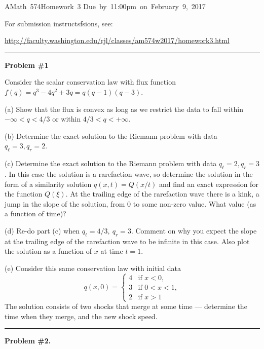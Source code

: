 \documentclass[11pt]{article}
\begin{document}
\hfill\vbox{\hbox{AMath 574}\hbox{Homework 3}
\hbox{Due by 11:00pm on February 9, 2017}}

For submission instructsfsions, see:

\url{http://faculty.washington.edu/rjl/classes/am574w2017/homework3.html}




\vskip 1cm
\hrule
{\bf Problem \#1}

Consider the scalar conservation law with flux function $f(q) = q^3 - 4q^2 +
3q = q(q-1)(q-3)$.

(a) Show that the flux is convex as long as we restrict the data to fall
within $-\infty < q < 4/3$ or within $4/3 < q < +\infty$.

(b) Determine the exact solution to the Riemann problem with data $q_\ell =
3, q_r = 2$.  

(c) Determine the exact solution to the Riemann problem with data $q_\ell =
2, q_r = 3$.  In this case the solution is a rarefaction wave, so determine
the solution in the form of a similarity solution $q(x,t) = Q(x/t)$ and find
an exact expression for the function $Q(\xi)$. At the trailing edge of the
rarefaction wave there is a kink, a jump in the slope of the solution, from
0 to some non-zero value.  What value (as a function of time)?

(d) Re-do part (c) when $q_\ell = 4/3,~ q_r = 3$.  
Comment on why you expect the slope at the trailing edge of the rarefaction
wave to be infinite in this case.
Also plot the solution as a function of $x$ at time $t=1$.

(e) Consider this same conservation law with initial data
\[
q(x,0) = \begin{cases} 
        4 &\text{if~}x<0,\\ 
        3 &\text{if~}0<x<1,\\
        2 &\text{if~}x>1
         \end{cases}
\]
The solution consists of two shocks that merge at some time --- determine
the time when they merge, and the new shock speed.




\vskip 1cm
\hrule
{\bf Problem \#2.}
\end{document}
